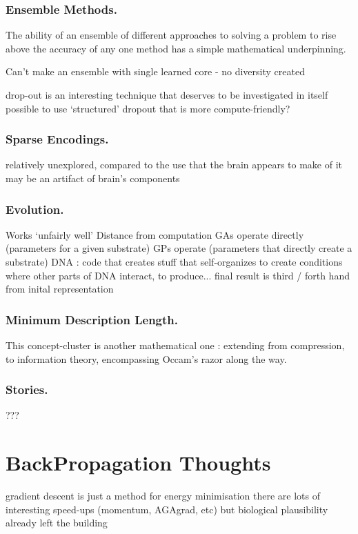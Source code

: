 \documentclass[citeauthoryear]{llncs}
\begin{document}
\subsubsection*{Ensemble Methods.}
The ability of an ensemble of different approaches to solving a problem to rise above the accuracy 
of any one method has a simple mathematical underpinning.  

Can't make an ensemble with single learned core - no diversity created

drop-out is an interesting technique that deserves to be investigated in itself
  possible to use `structured' dropout that is more compute-friendly?


\subsubsection*{Sparse Encodings.}
  relatively unexplored, compared to the use that the brain appears to make of it
    may be an artifact of brain's components
    
\subsubsection*{Evolution.}
  Works `unfairly well'
  Distance from computation
    GAs operate directly (parameters for a given substrate)
    GPs operate (parameters that directly create a substrate)
    DNA : code that creates stuff that self-organizes to create conditions where 
      other parts of DNA interact, to produce...   
        final result is third / forth hand from inital representation

\subsubsection*{Minimum Description Length.}
This concept-cluster is another mathematical one : extending from compression, to information theory,
encompassing Occam's razor along the way.

\subsubsection*{Stories.}
  ???


\section{BackPropagation Thoughts}
  gradient descent is just a method for energy minimisation
    there are lots of interesting speed-ups (momentum, AGAgrad, etc)
      but biological plausibility already left the building
      
\end{document}
